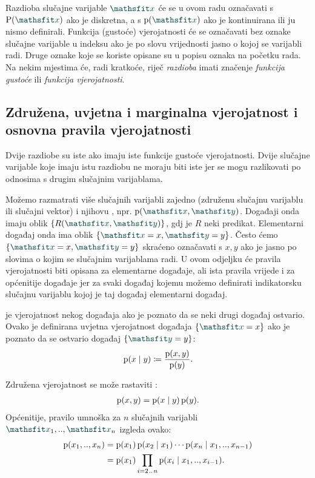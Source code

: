 \documentclass[utf8, diplomski, lmodern]{fer}
\begin{document}
Razdioba slučajne varijable $\rvar x$ će se u ovom radu označavati s $\P(\rvar x)$ ako je diskretna, a s $\p(\rvar x)$ ako je kontinuirana ili ju nismo definirali. Funkcija (gustoće) vjerojatnosti će se označavati bez oznake slučajne varijable u indeksu ako je po slovu vrijednosti jasno o kojoj se varijabli radi. Druge oznake koje se koriste opisane su u popisu oznaka na početku rada. Na nekim mjestima će, radi kratkoće, riječ \textit{razdioba} imati značenje \textit{funkcija gustoće} ili \textit{funkcija vjerojatnosti}.

\subsection{Združena, uvjetna i marginalna vjerojatnost i osnovna pravila vjerojatnosti}

Dvije razdiobe su iste ako imaju iste funkcije gustoće vjerojatnosti. Dvije slučajne varijable koje imaju istu razdiobu ne moraju biti iste jer se mogu razlikovati po odnosima s drugim slučajnim varijablama.

Možemo razmatrati više slučajnih varijabli zajedno (združenu slučajnu varijablu ili slučajni vektor) i njihovu , npr. $\p(\rvar x,\rvar y)$. Događaji onda imaju oblik $\cbr{R(\rvar x,\rvar y)}$, gdj je $R$ neki predikat. Elementarni događaj onda ima oblik $\cbr{\rvar x=x, \rvar y=y}$. Često ćemo $\cbr{\rvar x=x, \rvar y=y}$ skraćeno označavati s $x, y$ ako je jasno po slovima o kojim se slučajnim varijablama radi. U ovom odjeljku će pravila vjerojatnosti biti opisana za elementarne događaje, ali ista pravila vrijede i za općenitije događaje jer za svaki događaj kojemu možemo definirati indikatorsku slučajnu varijablu kojoj je taj događaj elementarni događaj.

 je vjerojatnost nekog događaja ako je poznato da se neki drugi događaj ostvario. Ovako je definirana uvjetna vjerojatnost događaja $\cbr{\rvar x=x}$ ako je poznato da se ostvario događaj $\cbr{\rvar y=y}$:
\begin{align} \label{eq:uvjetna-vj}
\operatorname*{\mathrm{p}}(x\mid y) \coloneqq \frac{\operatorname*{\mathrm{p}}(x,y)}{\operatorname*{\mathrm{p}}(y)}  \text{.}
\end{align}

Združena vjerojatnost se može rastaviti : 
\begin{align}  \label{eq:pravilo-umnoska-bin}
\operatorname*{\mathrm{p}}(x,y) = \operatorname*{\mathrm{p}}(x\mid y)\operatorname*{\mathrm{p}}(y) \text{.}
\end{align}
Općenitije, pravilo umnoška za $n$ slučajnih varijabli $\rvar x_1,..,\rvar x_n$ izgleda ovako:
\begin{align} \label{eq:pravilo-umnoska}
\operatorname*{\mathrm{p}}(x_1,..,x_n) 
&=\operatorname*{\mathrm{p}}(x_1)\operatorname*{\mathrm{p}}(x_2\mid x_1)\cdots\operatorname*{\mathrm{p}}(x_n\mid x_1,..,x_{n-1})  \\
&=\operatorname*{\mathrm{p}}(x_1)\prod_{i=2\mkern1.5mu{..}\mkern1.5mu n}\operatorname*{\mathrm{p}}(x_i\mid x_1,..,x_{i-1})  \text{.}
\end{align}
\end{document}
